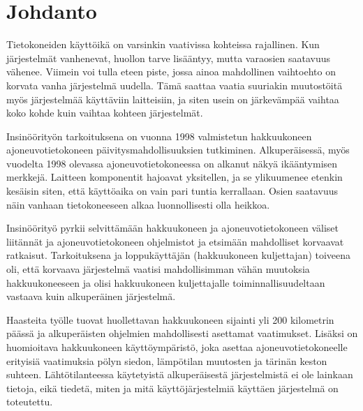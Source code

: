 \newpage

\pagestyle{plain}

\setcounter{page}{1} %
\ClearWallPaper

\chapter{Johdanto}
Tietokoneiden käyttöikä on varsinkin vaativissa kohteissa rajallinen. Kun järjestelmät vanhenevat, huollon tarve lisääntyy, mutta varaosien saatavuus vähenee. Viimein voi tulla eteen piste, jossa ainoa mahdollinen vaihtoehto on korvata vanha järjestelmä uudella. Tämä saattaa vaatia suuriakin muutostöitä myös järjestelmää käyttäviin laitteisiin, ja siten usein on järkevämpää vaihtaa koko kohde kuin vaihtaa kohteen järjestelmät.

Insinöörityön tarkoituksena on vuonna 1998 valmistetun hakkuukoneen ajoneuvotietokoneen päivitysmahdollisuuksien tutkiminen. Alkuperäisessä, myös vuodelta 1998 olevassa ajoneuvotietokoneessa on alkanut näkyä ikääntymisen merkkejä. Laitteen komponentit hajoavat yksitellen, ja se ylikuumenee etenkin kesäisin siten, että käyttöaika on vain pari tuntia kerrallaan. Osien saatavuus näin vanhaan tietokoneeseen alkaa luonnollisesti olla heikkoa.

Insinöörityö pyrkii selvittämään hakkuukoneen ja ajoneuvotietokoneen väliset liitännät ja ajoneuvotietokoneen ohjelmistot ja etsimään mahdolliset korvaavat ratkaisut. Tarkoituksena ja loppukäyttäjän (hakkuukoneen kuljettajan) toiveena oli, että korvaava järjestelmä vaatisi mahdollisimman vähän muutoksia hakkuukoneeseen ja olisi hakkuukoneen kuljettajalle toiminnallisuudeltaan vastaava kuin alkuperäinen järjestelmä.

Haasteita työlle tuovat huollettavan hakkuukoneen sijainti yli 200 kilometrin päässä ja alkuperäisten ohjelmien mahdollisesti asettamat vaatimukset. Lisäksi on huomioitava hakkuukoneen käyttöympäristö, joka asettaa ajoneuvotietokoneelle erityisiä vaatimuksia pölyn siedon, lämpötilan muutosten ja tärinän keston suhteen. Lähtötilanteessa käytetyistä alkuperäisestä järjestelmistä ei ole lainkaan tietoja, eikä tiedetä, miten ja mitä käyttöjärjestelmiä käyttäen järjestelmä on toteutettu.

